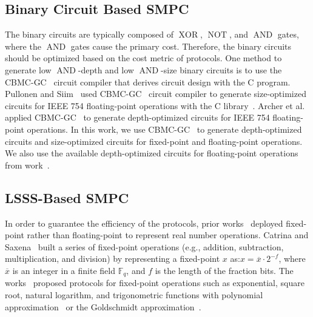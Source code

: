 \subsection{Binary Circuit Based SMPC}
\label{subsec:BinaryCircuitBasedSMPC}

The binary circuits are typically composed of $\operatorname{XOR}$, $\operatorname{NOT}$, and $\operatorname{AND}$ gates, where the $\operatorname{AND}$ gates cause the primary cost. Therefore, the binary circuits should be optimized based on the cost metric of \smpc protocols. One method to generate low $\operatorname{AND}$-depth and low $\operatorname{AND}$-size binary circuits is to use the CBMC-GC~\cite{buscher2016compiling} circuit compiler that derives circuit design with the C program. Pullonen and Siim~\cite{pullonen2015combining} used CBMC-GC~\cite{buscher2016compiling} circuit compiler to generate size-optimized circuits for IEEE 754 floating-point operations with the C library~\cite{BerkelySoftFloat,musllibc}. Archer et al.~\cite{archer2021cost} applied CBMC-GC~\cite{buscher2016compiling} to generate depth-optimized circuits for IEEE 754 floating-point operations. In this work, we use CBMC-GC~\cite{archer2021cost} to generate depth-optimized circuits and size-optimized circuits for fixed-point and floating-point operations. We also use the available depth-optimized circuits for floating-point operations from work~\cite{demmler2015aby,archer2021cost}.

\subsection{LSSS-Based SMPC}
\label{subsec:LSSS-BasedSMPC}
In order to guarantee the efficiency of the \smpc protocols, prior works~\cite{catrina2010secure,liedel2012secure,hemenway2016high,aly2019benchmarking,lu2020faster} deployed fixed-point rather than floating-point to represent real number operations.
Catrina and Saxena~\cite{catrina2010secure} built a series of fixed-point operations (e.g., addition, subtraction, multiplication, and division) by representing a fixed-point $x$ as:$x = \overline{x}\cdot  2^{-f}$, where $\overline{x}$ is an integer in a finite field $\mathbb{F} _q$, and $f$ is the length of the fraction bits.
The works~\cite{liedel2012secure,hemenway2016high,aly2019benchmarking,lu2020faster} proposed protocols for fixed-point operations such as exponential, square root, natural logarithm, and trigonometric functions with polynomial approximation~\cite{hart1978computer} or the Goldschmidt approximation~\cite{markstein2004software}.

